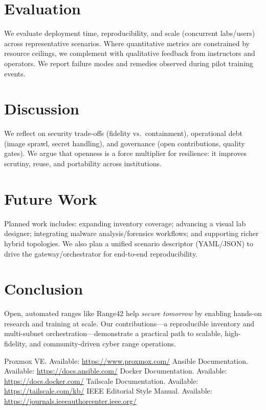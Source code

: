 \documentclass[11pt]{article}
\begin{document}
\section{Evaluation}
We evaluate deployment time, reproducibility, and scale (concurrent labs/users) across representative scenarios. Where quantitative metrics are constrained by resource ceilings, we complement with qualitative feedback from instructors and operators. We report failure modes and remedies observed during pilot training events.

\section{Discussion}
We reflect on security trade-offs (fidelity vs.\ containment), operational debt (image sprawl, secret handling), and governance (open contributions, quality gates). We argue that openness is a force multiplier for resilience: it improves scrutiny, reuse, and portability across institutions.

\section{Future Work}
Planned work includes: expanding inventory coverage; advancing a visual lab designer; integrating malware analysis/forensics workflows; and supporting richer hybrid topologies. We also plan a unified scenario descriptor (YAML/JSON) to drive the gateway/orchestrator for end-to-end reproducibility.

\section{Conclusion}
Open, automated ranges like Range42 help \emph{secure tomorrow} by enabling hands-on research and training at scale. Our contributions---a reproducible inventory and multi-subnet orchestration---demonstrate a practical path to scalable, high-fidelity, and community-driven cyber range operations.


\begin{thebibliography}{99}
 Proxmox VE. Available: \url{https://www.proxmox.com/}
 Ansible Documentation. Available: \url{https://docs.ansible.com/}
 Docker Documentation. Available: \url{https://docs.docker.com/}
 Tailscale Documentation. Available: \url{https://tailscale.com/kb/}
 IEEE Editorial Style Manual. Available: \url{https://journals.ieeeauthorcenter.ieee.org/}
\end{thebibliography}
\end{document}
